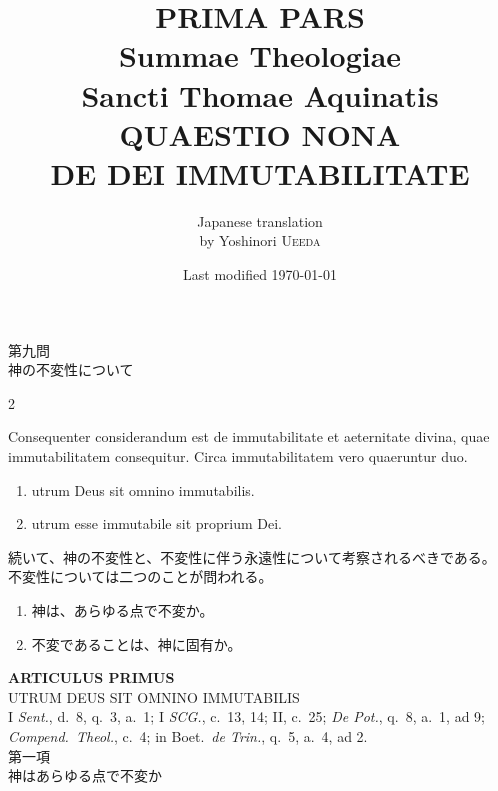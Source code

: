 \documentclass[paper=a4paper,fontsize=10pt,jafontsize=9pt,titlepage]{jlreq}
\title{{\bfseries PRIMA PARS}\\{\Huge Summae Theologiae}\\Sancti Thomae
Aquinatis\\{\sffamily QUAESTIO NONA}\\DE DEI IMMUTABILITATE}
\author{Japanese translation\\by Yoshinori {\scshape Ueeda}}
\date{Last modified \today}
\begin{document}
\maketitle

\begin{center}
 {\Large 第九問\\神の不変性について}
\end{center}

\begin{paracol}{2}

Consequenter considerandum est de immutabilitate et aeternitate
divina, quae immutabilitatem consequitur. Circa immutabilitatem vero
quaeruntur duo.
\begin{enumerate}
 \item utrum Deus sit omnino immutabilis. 
 \item utrum esse immutabile sit proprium Dei.
\end{enumerate}

\switchcolumn

続いて、神の不変性と、不変性に伴う永遠性について考察されるべきである。
 不変性については二つのことが問われる。

\begin{enumerate}
\item 神は、あらゆる点で不変か。
\item 不変であることは、神に固有か。
\end{enumerate}

\end{paracol}
\newpage
{}
\begin{center}
 {\Large {\bfseries ARTICULUS PRIMUS}}\\
 {\large UTRUM DEUS SIT OMNINO IMMUTABILIS}\\
 {\footnotesize I {\itshape Sent.}, d.~8, q.~3, a.~1; I {\itshape SCG.},
 c.~13, 14; II, c.~25; {\itshape De Pot.}, q.~8, a.~1, ad 9; {\itshape
 Compend.~Theol.}, c.~4; in Boet.~{\itshape de Trin.}, q.~5, a.~4, ad 2.}\\
 {\Large 第一項\\神はあらゆる点で不変か}
\end{center}


{}
\setcounter{section}{1}
\setcounter{subsection}{0}
\end{document}
